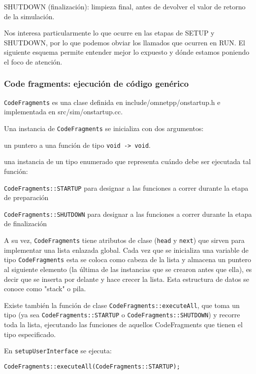 \documentclass[]{article}
\begin{document}
SHUTDOWN (finalización): limpieza final, antes de devolver el valor de retorno
de la simulación.

Nos interesa particularmente lo que ocurre en las etapas de SETUP y SHUTDOWN,
por lo que podemos obviar los llamados que ocurren en RUN. El siguiente esquema
permite entender mejor lo expuesto y dónde estamos poniendo el foco de
atención.


\subsubsection{Code fragments: ejecución de código genérico}

\verb!CodeFragments! es una clase definida en include/omnetpp/onstartup.h e
implementada en src/sim/onstartup.cc.

Una instancia de \verb!CodeFragments! se inicializa con dos argumentos:

un puntero a una función de tipo \verb!void -> void!.

una instancia de un tipo enumerado que representa cuándo debe ser ejecutada tal
función:

\verb!CodeFragments::STARTUP! para designar a las funciones a correr durante la
etapa de preparación

\verb!CodeFragments::SHUTDOWN! para designar a las funciones a correr durante
la etapa de finalización

A su vez, \verb!CodeFragments! tiene atributos de clase (\verb!head! y
\verb!next!) que sirven para implementar una lista enlazada global. Cada vez
que se inicializa una variable de tipo \verb!CodeFragments! esta se coloca como
cabeza de la lista y almacena un puntero al siguiente elemento (la última de
las instancias que se crearon antes que ella), es decir que se inserta por
delante y hace crecer la lista.  Esta estructura de datos se conoce como
"stack" o pila.

Existe también la función de clase \verb!CodeFragments::executeAll!, que toma
un tipo (ya sea \verb!CodeFragments::STARTUP! o \verb!CodeFragments::SHUTDOWN!)
y recorre toda la lista, ejecutando las funciones de aquellos CodeFragments que
tienen el tipo especificado.

En \verb!setupUserInterface! se ejecuta:

\begin{verbatim}
CodeFragments::executeAll(CodeFragments::STARTUP);
\end{verbatim}
\end{document}
